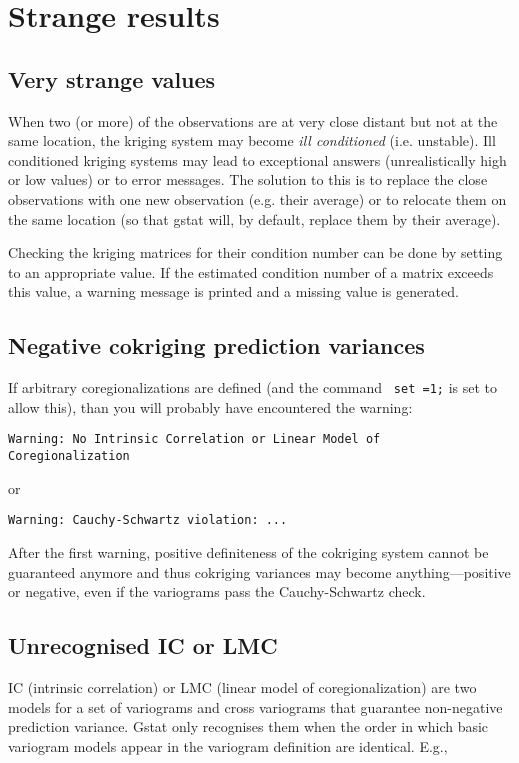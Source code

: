 \documentclass[a4paper,12pt]{book}
\renewcommand{\cite}{\citet}
\newcommand{\code}[1]{\texttt{#1}}
\newcommand{\iskey}[1]{\htmlref{\code{{#1}}}{key:#1}}
\newcommand{\isXkey}[2]{\htmlref{\code{{#1}}}{key:#2}}
\begin{document}
\section{Strange results}
\label{app:strange}

\subsection*{Very strange values}
When two (or more) of the observations are at very close distant but not
at the same location, the kriging system may become {\em ill conditioned}
(i.e. unstable). Ill conditioned kriging systems may lead to exceptional
answers (unrealistically high or low values) or to error messages. The
solution to this is to replace the close observations with one new
observation (e.g. their average) or to relocate them on the same location
(so that gstat will, by default, replace them by their average).

Checking the kriging matrices for their condition number can be done
by setting \isXkey{cn\_max}{cnXmax} to an appropriate value. If the
estimated condition number of a matrix exceeds this value, a warning
message is printed and a missing value is generated.

\subsection*{Negative cokriging prediction variances}
If arbitrary coregionalizations are defined (and the command {\tt
set \iskey{nocheck}=1;} is set to allow this), than you will probably
have encountered the warning:

\code{Warning: No Intrinsic Correlation or Linear Model of\\
Coregionalization}

\noindent
or

\code{Warning: Cauchy-Schwartz violation: ...}

\noindent
After the first warning, positive definiteness of the cokriging system
cannot be guaranteed anymore and thus cokriging variances may become
anything---positive or negative, even if the variograms pass the
Cauchy-Schwartz check.


\subsection*{Unrecognised IC or LMC}

IC (intrinsic correlation) or LMC (linear model of coregionalization)
\cite{journel78,goovaerts97} are two models for a set of variograms and
cross variograms that guarantee non-negative prediction variance. Gstat
only recognises them when the order in which basic variogram models
appear in the variogram definition are identical. E.g.,
\end{document}

